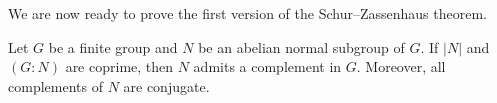 
	
	



We are now ready to prove the first version of the
Schur--Zassenhaus theorem. 

\begin{theorem}
	\label{thm:SchurZassenhaus:abeliano}
	Let $G$ be a finite group and $N$ be an abelian normal subgroup of $G$. If 
 	$|N|$ and $(G:N)$ are coprime, then $N$ admits a complement in $G$. Moreover, 
    all complements of $N$ are conjugate. 
\end{theorem}

